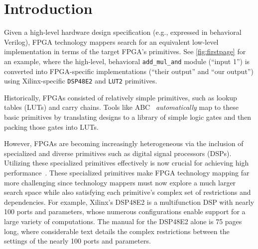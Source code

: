 \section{Introduction}
\label{sec:intro}

Given a high-level hardware design specification
  (e.g., expressed in behavioral Verilog),
  FPGA technology mappers
  search for an equivalent
  low-level implementation
  in terms of the target FPGA's
  primitives.
See \cref{fig:firstpage} for an example, where
the high-level, behavioral \texttt{add\_mul\_and}
  module (``input 1'')
  is converted into FPGA-specific implementations
  (``their output'' and ``our output'')
  using Xilinx-specific
  \texttt{DSP48E2} and \texttt{LUT2} primitives.
  
Historically,
  FPGAs consisted of relatively simple
  primitives, such as
  lookup tables (LUTs) and carry chains.
Tools like
  ABC~\cite{ABC,abc2,brayton2010abc}
  \textit{automatically} 
  map to these basic primitives
  by translating designs
  to a library of simple logic gates
  and then packing those gates
  into LUTs.

However, FPGAs are becoming
  increasingly heterogeneous
  via
  the inclusion of specialized and diverse primitives
  such as digital signal processors (DSPs).
Utilizing these specialized primitives
  effectively
  is now
  crucial for achieving
  high performance~\cite{vega2021reticle}.
These specialized primitives
  make FPGA technology mapping far more challenging
  since technology mappers must now
  explore a much larger search space
  while also satisfying each primitive's
  complex set of restrictions and dependencies.
For example, Xilinx's DSP48E2
  is a multifunction 
  DSP
  with nearly
  100 ports and parameters,
  whose numerous configurations
  enable 
  support for a large variety of computations.
The manual for the DSP48E2 alone
  is 75 pages long,
  where considerable text details
  the complex restrictions
  between the settings of the nearly 100
  ports and parameters.

